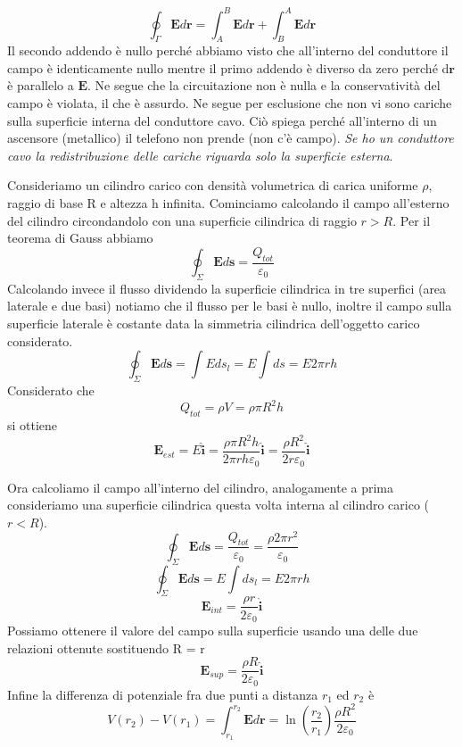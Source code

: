 \documentclass[
10pt, %
a4paper, %
oneside, %
headinclude,footinclude, %
BCOR5mm, %
]{scrartcl}
\begin{document}
\begin{enumerate}
\[\oint_{\Gamma}\mathbf{E}d\mathbf{r}= \int_{A}^{B}\mathbf{E}d\mathbf{r}+\int_{B}^{A}\mathbf{E}d\mathbf{r}\]
Il secondo addendo è nullo perché abbiamo visto che all'interno del conduttore il campo è identicamente nullo mentre il primo addendo è diverso da zero perché d$\mathbf{r}$ è parallelo a $\mathbf{E}$. Ne segue che la circuitazione non è nulla e la conservatività del campo è violata, il che è assurdo. Ne segue per esclusione che non vi sono cariche sulla superficie interna del conduttore cavo. Ciò spiega perché all'interno di un ascensore (metallico) il telefono non prende (non c'è campo). 
\textit{Se ho un conduttore cavo la redistribuzione delle cariche riguarda solo la superficie esterna}. 
\end{enumerate}
\begin{esercizio}
Consideriamo un cilindro carico con densità volumetrica di carica uniforme $\rho$, raggio di base R e altezza h infinita. Cominciamo calcolando il campo all'esterno del cilindro circondandolo con una superficie cilindrica di raggio \(r>R\). Per il teorema di Gauss abbiamo
\[\oint_{\Sigma}\mathbf{E}d\mathbf{s}=\frac{Q_{tot}}{\varepsilon_0}\]
Calcolando invece il flusso dividendo la superficie cilindrica in tre superfici (area laterale e due basi) notiamo che il flusso per le basi è nullo, inoltre il campo sulla superficie laterale è costante data la simmetria cilindrica dell'oggetto carico considerato.
\[\oint_{\Sigma}\mathbf{E}d\mathbf{s}=\int E ds_l = E\int ds = E2\pi r h\]
Considerato che
\[Q_{tot} = \rho V = \rho \pi R^2 h\]
si ottiene
\[\mathbf{E}_{est} = E \hat{\mathbf{i}} = \frac{\rho \pi R^2 h }{2\pi r h \varepsilon_0} \hat{\mathbf{i}}= \frac{\rho R^2 }{2 r \varepsilon_0}\hat{\mathbf{i}}\]
\end{esercizio}
Ora calcoliamo il campo all'interno del cilindro, analogamente a prima consideriamo una superficie cilindrica questa volta interna al cilindro carico (\(r<R\)). 
\[\oint_{\Sigma}\mathbf{E}d\mathbf{s}=\frac{Q_{tot}}{\varepsilon_0} = \frac{\rho 2 \pi r^2}{\varepsilon_0}\]
\[\oint_{\Sigma}\mathbf{E}d\mathbf{s}=E\int ds_l = E2\pi rh\]
\[\mathbf{E}_{int} = \frac{\rho r}{2\varepsilon_0}\hat{\mathbf{i}}\]
Possiamo ottenere il valore del campo sulla superficie usando una delle due relazioni ottenute sostituendo R = r
\[\mathbf{E}_{sup} = \frac{\rho R}{2\varepsilon_0}\hat{\mathbf{i}}\]
Infine la differenza di potenziale fra due punti a distanza \(r_1\) ed \(r_2\) è
\[V(r_2)-V(r_1) = \int_{r_1}^{r_2}\mathbf{E}d\mathbf{r}=\ln\left(\frac{r_2}{r_1}\right)\frac{\rho R^2}{2\varepsilon_0}\]
\end{document}
